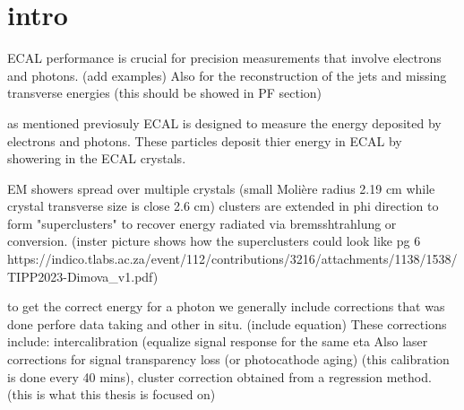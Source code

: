 
\section{intro}

ECAL performance is crucial for	precision measurements that involve electrons and photons. (add examples) 
Also for the reconstruction of the jets	and missing transverse energies	(this should be showed in PF section)

as mentioned previosuly ECAL is designed to measure the energy deposited by electrons and photons. 
These particles deposit thier energy in ECAL by showering in the ECAL crystals.


EM showers spread over multiple crystals (small Molière radius 2.19 cm while crystal transverse size is close 2.6 cm)
clusters are extended in phi direction to form "superclusters" to recover energy radiated via bremsshtrahlung or conversion.
(inster picture shows how the superclusters could look like pg 6 https://indico.tlabs.ac.za/event/112/contributions/3216/attachments/1138/1538/TIPP2023-Dimova_v1.pdf)

to get the correct energy for a photon we generally include corrections that was done perfore data taking and other in situ.
(include equation) 
These corrections include: intercalibration (equalize signal response for the same eta
Also laser corrections for signal transparency loss (or photocathode aging) (this calibration is done every 40 mins),
cluster correction obtained from a regression method. (this is what this thesis is focused on)

